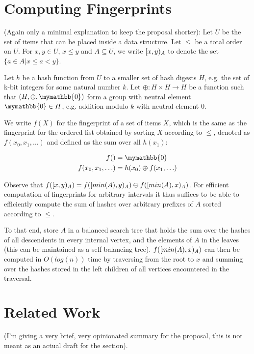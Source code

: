 \documentclass{article}
\begin{document}
\section{Computing Fingerprints}\label{computing-fingerprints}

(Again only a minimal explanation to keep the proposal shorter): Let $U$ be the set of items that can be placed inside a data structure. Let $\leq$ be a total order on $U$. For $x, y \in U$, $x \leq y$ and $A \subseteq U$, we write $[{x},{y})_{A}$ to denote the set $\{a \in A | x \leq a < y\}$.

Let $h$ be a hash function from $U$ to a smaller set of hash digests $H$, e.g. the set of k-bit integers for some natural number $k$.
Let $\oplus: H \times H \rightarrow H$ be a function such that $(H, \oplus, \mymathbb{0})$ form a group with neutral element $\mymathbb{0} \in H$, e.g. addition modulo $k$ with neutral element $0$.

We write $f(X)$ for the fingerprint of a set of items $X$, which is the same as the fingerprint for the ordered list obtained by sorting $X$ according to $\leq$, denoted as $f(x_0, x_1, \ldots)$ and defined as the sum over all $h(x_1)$:

\begin{align*}
f() &= \mymathbb{0}\\
f(x_0, x_1, \ldots) &= h(x_0) \oplus f(x_1, \ldots)\\
\end{align*}

Observe that $f([{x},{y})_{A}) = f([{min(A)},{y})_{A}) \ominus f([{min(A)},{x})_{A})$. For efficient computation of fingerprints for arbitrary intervals it thus suffices to be able to efficiently compute the sum of hashes over arbitrary prefixes of $A$ sorted according to $\leq$.

To that end, store $A$ in a balanced search tree that holds the sum over the hashes of all descendents in every internal vertex, and the elements of $A$ in the leaves (this can be maintained as a self-balancing tree). $f([{min(A)},{x})_{A})$ can then be computed in $O(log(n))$ time by traversing from the root to $x$ and summing over the hashes stored in the left children of all vertices encountered in the traversal.

\section{Related Work}\label{related-work}

(I'm giving a very brief, very opinionated summary for the proposal, this is not meant as an actual draft for the section).
\end{document}
